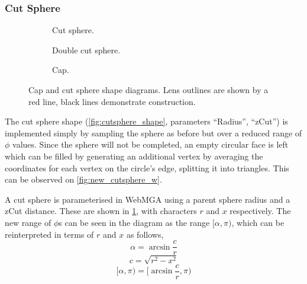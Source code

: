 \subsubsection{Cut Sphere}
\label{cut_sphere_section}
\begin{figure}
  \begin{center}
    \begin{subfigure}{0.3\textwidth}
      
      \caption{Cut sphere.}
      \label{fig:cut_sphere_diagram}
    \end{subfigure}
    \begin{subfigure}{0.3\textwidth}
      
      \caption{Double cut sphere.}
      \label{fig:double_cut_diagram}
    \end{subfigure}
    \begin{subfigure}{0.3\textwidth}
      
      \caption{Cap.}
      \label{fig:cap_diagram}
    \end{subfigure}
  \end{center}
  \caption{Cap and cut sphere shape diagrams. Lens outlines are shown by a red line, black lines demonstrate construction.}
  \label{fig:cap_cut_descriptions}
\end{figure}
The cut sphere shape (\cref{fig:cutsphere_shape}, parameters ``Radius'', ``zCut'') is implemented simply by sampling the sphere as before but over a reduced range of $\phi$ values. Since the sphere will not be completed, an empty circular face is left which can be filled by generating an additional vertex by averaging the coordinates for each vertex on the circle's edge, splitting it into triangles. This can be observed on \cref{fig:new_cutsphere_w}.

A cut sphere is parameterised in WebMGA using a parent sphere radius and a zCut distance. These are shown in \cref{fig:cut_sphere_diagram}, with characters $r$ and $x$ respectively. The new range of $\phi$s can be seen in the diagram as the range $[\alpha,\pi)$, which can be reinterpreted in terms of $r$ and $x$ as follows,
\begin{equation}
\alpha=\arcsin\frac{c}{r}
\end{equation}
\begin{equation}
c=\sqrt{r^2-x^2}
\end{equation}
\begin{equation}
[\alpha,\pi)=[\arcsin\frac{c}{r},\pi)
\end{equation}

